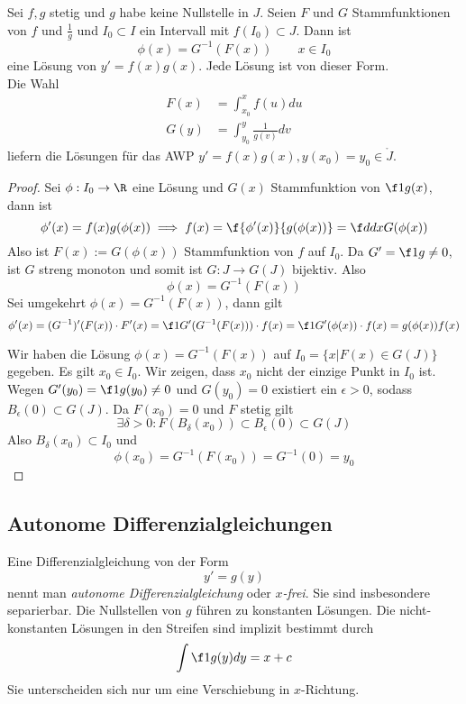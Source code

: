 \documentclass{mycourse}
\begin{document}
\begin{st}
	Sei $f,g$ stetig und $g$ habe keine Nullstelle in $J$. Seien $F$ und $G$ Stammfunktionen von
	$f$ und $\frac{1}{g}$ und $I_0\subset I$ ein Intervall mit $f(I_0)\subset J$. Dann ist
	\[
	\phi(x)=G^{-1}(F(x)) \qquad x\in I_0
	\]
	eine Lösung von $y'=f(x)g(x)$. Jede Lösung ist von dieser Form.\\
	Die Wahl 
	\begin{align*}
		F(x)&=\int_{x_0}^xf(u)du\\
	 G(y)&=\int_{y_0}^y\frac{1}{g(v)}dv
	\end{align*}
	liefern die Lösungen für das AWP $y'=f(x)g(x), y(x_0)=y_0 \in \mathring J$.
	\begin{proof}
		Sei $\phi : I_0 \to \R$ eine Lösung und $G(x)$ Stammfunktion von $\f 1{g(x)}$, dann ist
		\[
			\phi'(x) = f(x)g(\phi(x)) \implies f(x) = \f {\phi'(x)}{g(\phi(x))} = \f d{dx} G(\phi(x))
		\]
		Also ist $F(x) := G(\phi(x))$ Stammfunktion von $f$ auf $I_0$.
		Da $G' = \f 1g \neq 0$, ist $G$ streng monoton und somit ist $G: J\to G(J)$ bijektiv.
		Also
		\[
			\phi(x) = G^{-1}(F(x))
		\]
		Sei umgekehrt $\phi(x) = G^{-1}(F(x))$, dann gilt
		\[
			\phi'(x) = (G^{-1})'(F(x))\cdot F'(x) = \f 1{G'(G^{-1}(F(x)))} \cdot f(x) = \f 1 {G'(\phi(x))} \cdot f(x) = g(\phi(x))f(x)
		\]

		Wir haben die Lösung $\phi(x) = G^{-1}(F(x))$ auf $I_0 = \{x\big| F(x)\in G(J)\}$ gegeben.
		Es gilt $x_0\in I_0$.
		Wir zeigen, dass $x_0$ nicht der einzige Punkt in $I_0$ ist.
		Wegen $G'(y_0) = \f 1 {g(y_0)}\neq 0$ und $G(y_0) = 0$ existiert ein $\epsilon > 0$, sodass $B_\epsilon(0) \subset G(J)$.
		Da $F(x_0) = 0$ und $F$ stetig gilt
		\[
			\exists \delta > 0 : F(B_\delta(x_0)) \subset B_\epsilon(0) \subset G(J)
		\]
		Also $B_\delta(x_0) \subset I_0$  und
		\[
			\phi(x_0) = G^{-1}(F(x_0)) = G^{-1}(0) = y_0
		\]
	\end{proof}
\end{st}

\subsection{Autonome Differenzialgleichungen}

\begin{df*}
	Eine Differenzialgleichung von der Form
	\[
		y'=g(y)
	\]
	nennt man \emph{autonome Differenzialgleichung} oder \emph{$x$-frei}.
	Sie sind insbesondere separierbar.
	Die Nullstellen von $g$ führen zu konstanten Lösungen.
	Die nicht-konstanten Lösungen in den Streifen sind implizit bestimmt durch
	\[
		\int \f 1{g(y)}dy = x + c
	\]
	Sie unterscheiden sich nur um eine Verschiebung in $x$-Richtung.
\end{df*}
\end{document}
